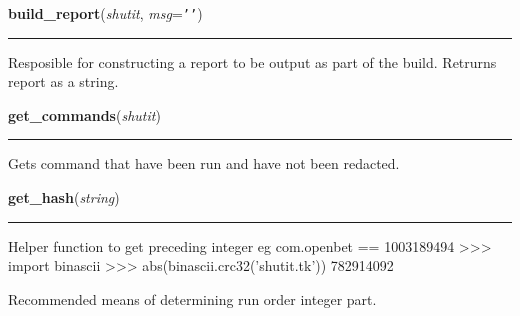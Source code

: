     \label{util:build_report}

    \vspace{0.5ex}

\hspace{.8\funcindent}\begin{boxedminipage}{\funcwidth}

    \raggedright \textbf{build\_report}(\textit{shutit}, \textit{msg}={\tt \texttt{'}\texttt{}\texttt{'}})

    \vspace{-1.5ex}

    \rule{\textwidth}{0.5\fboxrule}
\setlength{\parskip}{2ex}
    Resposible for constructing a report to be output as part of the build.
    Retrurns report as a string.

\setlength{\parskip}{1ex}
    \end{boxedminipage}

    \label{util:get_commands}

    \vspace{0.5ex}

\hspace{.8\funcindent}\begin{boxedminipage}{\funcwidth}

    \raggedright \textbf{get\_commands}(\textit{shutit})

    \vspace{-1.5ex}

    \rule{\textwidth}{0.5\fboxrule}
\setlength{\parskip}{2ex}
    Gets command that have been run and have not been redacted.

\setlength{\parskip}{1ex}
    \end{boxedminipage}

    \label{util:get_hash}

    \vspace{0.5ex}

\hspace{.8\funcindent}\begin{boxedminipage}{\funcwidth}

    \raggedright \textbf{get\_hash}(\textit{string})

    \vspace{-1.5ex}

    \rule{\textwidth}{0.5\fboxrule}
\setlength{\parskip}{2ex}
    Helper function to get preceding integer eg com.openbet == 1003189494 
    {\textgreater}{\textgreater}{\textgreater} import binascii 
    {\textgreater}{\textgreater}{\textgreater} 
    abs(binascii.crc32('shutit.tk')) 782914092

    Recommended means of determining run order integer part.

\setlength{\parskip}{1ex}
    \end{boxedminipage}

